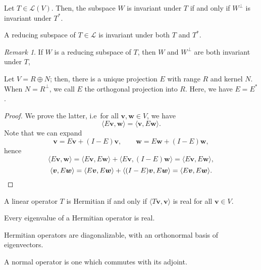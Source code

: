 \documentclass[11pt]{article}
\renewcommand{\vec}[1]{\boldsymbol{#1}}
\newcommand{\vv}{\vec{v}}
\newcommand{\vw}{\vec{w}}
\newcommand{\alg}[1]{\mathscr{#1}}
\newcommand{\algL}{\alg{L}}
\newcommand{\ip}[2]{\langle #1, #2 \rangle}
\theoremstyle{definition}
\theoremstyle{remark}
\newtheorem*{remark}{Remark}
\numberwithin{equation}{section}
\begin{document}
    \begin{lemma}
        Let $T \in \algL(V)$. Then, the subspace $W$ is invariant under $T$ if and
        only if $W^\perp$ is invariant under $T^*$.
    \end{lemma}

    \begin{definition}
        A reducing subspace of $T \in \alg{L}$ is invariant under both $T$ and $T^*$.
        \begin{remark}
            If $W$ is a reducing subspace of $T$, then $W$ and $W^\perp$ are both
            invariant under $T$,
        \end{remark}
    \end{definition}

    \begin{lemma}
        Let $V = R \oplus N$; then, there is a unique projection $E$ with range $R$
        and kernel $N$. When $N = R^\perp$, we call $E$ the orthogonal projection into
        $R$. Here, we have $E = E^*$.
    \end{lemma}
    \begin{proof}
        We prove the latter, i.e\ for all $\vv, \vw \in V$, we have \[
            \ip{E\vv}{\vw} = \ip{\vv}{E\vw}.
        \] Note that we can expand \[
            \vv = E\vv + (I - E)\vv, \qquad
            \vw = E\vw + (I - E)\vw,
        \] hence \[
            \ip{E\vv}{\vw} = \ip{E\vv}{E\vw} + \ip{E\vv}{(I - E)\vw} =
            \ip{E\vv}{E\vw},
        \] \[
            \ip{\vv}{E\vw} = \ip{E\vv}{E\vw} + \ip{(I - E)\vv}{E\vw} =
            \ip{E\vv}{E\vw}. \qedhere
        \] 
    \end{proof}
    
    \begin{lemma}
        A linear operator $T$ is Hermitian if and only if $\ip{T\vv}{\vv}$ is real
        for all $\vv \in V$.
    \end{lemma}
    \begin{corollary}
        Every eigenvalue of a Hermitian operator is real.
    \end{corollary}

    \begin{theorem}
        Hermitian operators are diagonalizable, with an orthonormal basis of
        eigenvectors.
    \end{theorem}

    \begin{definition}
        A normal operator is one which commutes with its adjoint.
    \end{definition}
\end{document}
